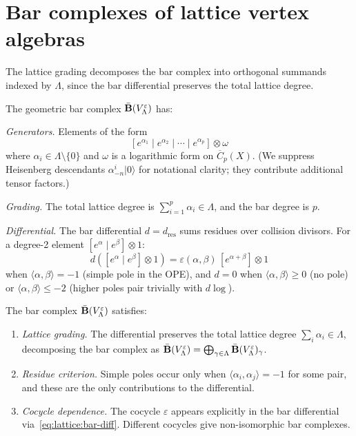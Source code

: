 \section{Bar complexes of lattice vertex algebras}
\label{sec:lattice:bar}

The lattice grading decomposes the bar complex into orthogonal summands indexed by $\Lambda$, since the bar differential preserves the total lattice degree.

\begin{construction}
\label{constr:lattice:bar-complex}
The geometric bar complex $\bar{\mathbf{B}}(V_\Lambda^\varepsilon)$ has:

\noindent\emph{Generators.} Elements of the form
\[
[e^{\alpha_1} \mid e^{\alpha_2} \mid \cdots \mid e^{\alpha_p}]
\otimes \omega
\]
where $\alpha_i \in \Lambda \setminus \{0\}$ and $\omega$ is a
logarithmic form on $\overline{C}_p(X)$. (We suppress Heisenberg
descendants $\alpha_{-n}^i |0\rangle$ for notational clarity; they
contribute additional tensor factors.)

\noindent\emph{Grading.} The total lattice degree is $\sum_{i=1}^p \alpha_i \in \Lambda$, and the bar degree is $p$.

\noindent\emph{Differential.}
The bar differential $d = d_{\text{res}}$ sums residues over collision
divisors. For a degree-2 element $[e^\alpha \mid e^\beta] \otimes 1$:
\begin{equation}\label{eq:lattice:bar-diff}
d([e^\alpha \mid e^\beta] \otimes 1)
= \varepsilon(\alpha,\beta)\,[e^{\alpha+\beta}] \otimes 1
\end{equation}
when $\langle\alpha,\beta\rangle = -1$ (simple pole in the OPE), and
$d = 0$ when $\langle\alpha,\beta\rangle \geq 0$ (no pole) or
$\langle\alpha,\beta\rangle \leq -2$ (higher poles pair trivially
with $d\log$).
\end{construction}

\begin{theorem}
\label{thm:lattice:bar-structure}
The bar complex $\bar{\mathbf{B}}(V_\Lambda^\varepsilon)$ satisfies:
\begin{enumerate}[label=(\roman*)]
\item \emph{Lattice grading.}
  The differential preserves the total lattice degree
  $\sum_i \alpha_i \in \Lambda$, decomposing the bar complex as
  $\bar{\mathbf{B}}(V_\Lambda^\varepsilon) =
  \bigoplus_{\gamma \in \Lambda}
  \bar{\mathbf{B}}(V_\Lambda^\varepsilon)_\gamma$.
\item \emph{Residue criterion.}
  Simple poles occur only when $\langle\alpha_i,\alpha_j\rangle = -1$
  for some pair, and these are the only contributions to the differential.
\item \emph{Cocycle dependence.}
  The cocycle $\varepsilon$ appears explicitly in the bar differential
  via~\eqref{eq:lattice:bar-diff}. Different cocycles give
  non-isomorphic bar complexes.
\end{enumerate}
\end{theorem}

